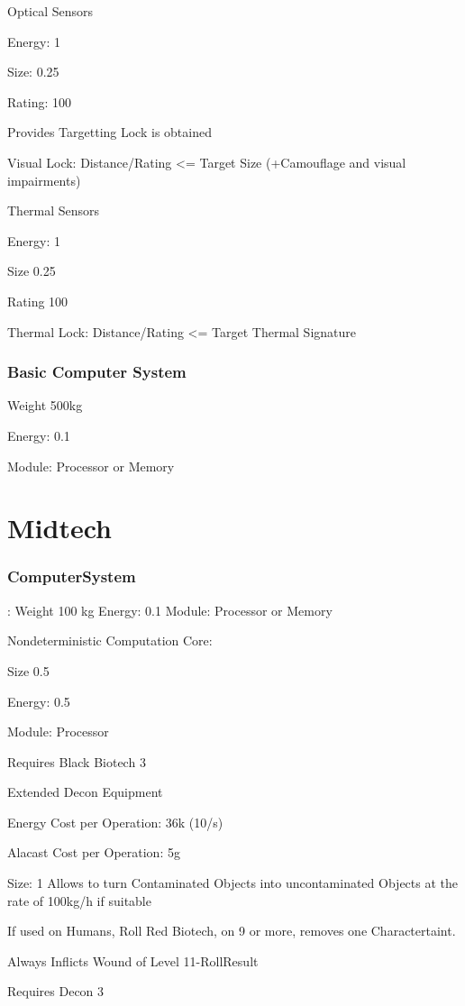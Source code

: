Optical Sensors\par
Energy: 1\par
Size: 0.25 \par
Rating: 100\par
Provides Targetting Lock is obtained\par
Visual Lock: Distance/Rating <= Target Size (+Camouflage and visual impairments)\par

Thermal Sensors\par
Energy: 1\par
Size 0.25\par
Rating 100\par
Thermal Lock: Distance/Rating <= Target Thermal Signature\par

\subsubsection{Basic Computer System}\par
Weight 500kg\par
Energy: 0.1\par
Module: Processor or Memory\par
\par
\section{Midtech}\label{sec:midtech}
\subsubsection{ComputerSystem}:
Weight 100 kg
Energy: 0.1
Module: Processor or Memory\par

Nondeterministic Computation Core:\par
Size 0.5\par
Energy: 0.5\par
Module: Processor\par
Requires Black Biotech 3\par

Extended Decon Equipment\par
Energy Cost per Operation: 36k (10/s)\par
Alacast Cost per Operation: 5g\par
Size: 1
Allows to turn Contaminated Objects into uncontaminated Objects at the rate of 100kg/h if suitable\par
If used on Humans, Roll Red Biotech, on 9 or more, removes one Charactertaint.\par
Always Inflicts Wound of Level 11-RollResult\par
Requires Decon 3\par


